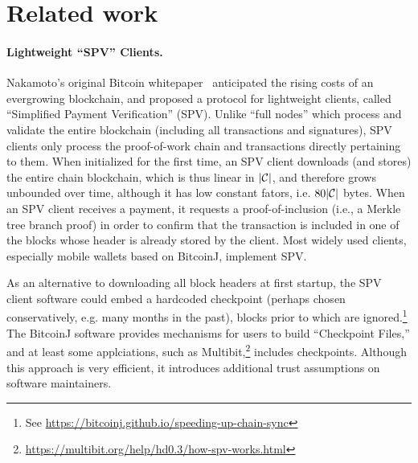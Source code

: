\section{Related work}

\paragraph{Lightweight ``SPV'' Clients.}
Nakamoto's original Bitcoin whitepaper~\cite{bitcoin} anticipated the rising costs of an evergrowing blockchain, and proposed a protocol for lightweight clients, called ``Simplified Payment Verification'' (SPV). Unlike ``full nodes'' which process and validate the entire blockchain (including all transactions and signatures), SPV clients only process the proof-of-work chain and transactions directly pertaining to them.
When initialized for the first time, an SPV client downloads (and stores) the entire chain blockchain, which is thus linear in $|\mathcal{C}|$, and therefore grows unbounded over time, although it has low constant fators, i.e.
$80|\mathcal{C}|$ bytes.
When an SPV client receives a payment, it requests a proof-of-inclusion (i.e., a Merkle tree branch proof) in order to confirm that the transaction is included in one of the blocks whose header is already stored by the client.
Most widely used clients, especially mobile wallets based on BitcoinJ, implement SPV. 


As an alternative to downloading all block headers at first startup, the SPV client software could embed a hardcoded checkpoint (perhaps chosen conservatively, e.g. many months in the past), blocks prior to which are ignored.\footnote{See \url{https://bitcoinj.github.io/speeding-up-chain-sync}} The BitcoinJ software provides mechanisms for users to build ``Checkpoint Files,'' and at least some applciations, such as Multibit,\footnote{\url{https://multibit.org/help/hd0.3/how-spv-works.html}} includes checkpoints. Although this approach is very efficient, it introduces additional trust assumptions on software maintainers. 

